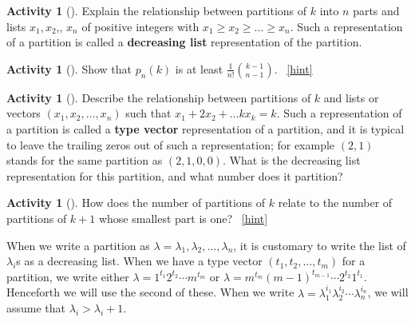\documentclass[10pt,]{book}
\newcommand{\terminology}[1]{\textbf{#1}}
\theoremstyle{plain}
\theoremstyle{definition}
\theoremstyle{definition}
\theoremstyle{definition}
\newtheorem{activity}[project]{Activity}
\numberwithin{equation}{chapter}
\begin{document}
\begin{activity}[]\label{activity-203}
\hypertarget{p-1131}{}%
Explain the relationship between partitions of \(k\) into \(n\) parts and lists \(x_1,x_2\),\textellipsis{}, \(x_n\) of positive integers with \(x_1\ge x_2\ge\ldots \ge x_n\). Such a representation of a partition is called a \terminology{decreasing list} representation of the partition.%
\end{activity}
\begin{activity}[]\label{activity-204}
\hypertarget{p-1133}{}%
Show that \(p_n(k)\) is at least \(\frac{1}{n!}\binom{k-1}{n-1}\).%
~\hfill{\tiny\hyperlink{a-211}{[hint]}\hypertarget{q-211}{}}\end{activity}
\begin{activity}[]\label{activity-205}
\hypertarget{p-1136}{}%
Describe the relationship between partitions of \(k\) and lists or vectors \((x_1,x_2,\ldots,x_n)\) such that \(x_1+2x_2+\ldots kx_k = k\).  Such a representation of a partition is called a \terminology{type vector} representation of a partition, and it is typical to leave the trailing zeros out of such a representation; for example \((2,1)\) stands for the same partition as \((2,1,0,0)\). What is the decreasing list representation for this partition, and what number does it partition?%
\end{activity}
\begin{activity}[]\label{activity-206}
\hypertarget{p-1138}{}%
How does the number of partitions of \(k\) relate to the number of partitions of \(k+1\) whose smallest part is one?%
~\hfill{\tiny\hyperlink{a-213}{[hint]}\hypertarget{q-213}{}}\end{activity}
\hypertarget{p-1141}{}%
When we write a partition as \(\lambda = \lambda_1,\lambda_2,\ldots,\lambda_n\), it is customary to write the list of \(\lambda_i\)s as a decreasing list. When we have a type vector \((t_1,t_2,\ldots,t_m)\) for a partition, we write either \(\lambda = 1^{t_1}2^{t_2}\cdots m^{t_m}\) or \(\lambda = m^{t_m}(m-1)^{t_{m-1}}\cdots 2^{t_2}1^{t_1}\). Henceforth we will use the second of these. When we write \(\lambda=\lambda_1^{i_1}\lambda_2^{i_2}\cdots\lambda_n^{i_n}\), we will assume that \(\lambda_i>\lambda_i+1\).%
\par
\hypertarget{p-1142}{}%
\end{document}
